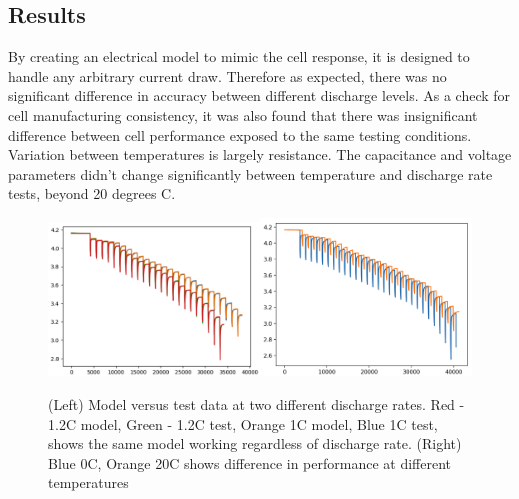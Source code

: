 \documentclass[]{aiaa-tc}%
\begin{document}
\subsection{Results}

By creating an electrical model to mimic the cell response, it is designed to handle any arbitrary current draw. Therefore as expected, there was no significant difference in accuracy between different discharge levels. As a check for cell manufacturing consistency, it was also found that there was insignificant difference between cell performance exposed to the same testing conditions. Variation between temperatures is largely resistance. The capacitance and voltage parameters didn't change significantly between temperature and discharge rate tests, beyond 20 degrees C.

\begin{figure}[!htb]
	\centering
	\includegraphics[width=0.5\textwidth]{figures/1_1o2C_20C.png}\includegraphics[width=0.5\textwidth]{figures/0_20C.png}
	\caption{(Left) Model versus test data at two different discharge rates. Red - 1.2C model, Green - 1.2C test, Orange 1C model, Blue 1C test, shows the same model working regardless of discharge rate. (Right) Blue 0C, Orange 20C shows difference in performance at different temperatures}
	\label{fig:paramE}
\end{figure}
\end{document}

